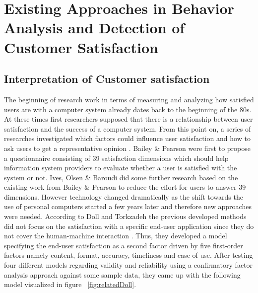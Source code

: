\chapter{Existing Approaches in Behavior Analysis and Detection of Customer Satisfaction}
\label{ch:backgroundResearch}

\section{Interpretation of Customer satisfaction}
The beginning of research work in terms of measuring and analyzing how satisfied users are with a computer system already dates back to the beginning of the 80s. At these times first researchers supposed that there is a relationship between user satisfaction and the success of a computer system. From this point on, a series of researches investigated which factors could influence user satisfaction and how to ask users to get a representative opinion \cite{roy1998developing}. Bailey \& Pearson were first to propose a questionnaire consisting of 39 satisfaction dimensions which should help information system providers to evaluate whether a user is satisfied with the system or not. Ives, Olsen \& Baroudi did some further research based on the existing work from Bailey \& Pearson to reduce the effort for users to answer 39 dimensions. However technology changed dramatically as the shift towards the use of personal computers started a few years later and therefore new approaches were needed. According to Doll and Torkzadeh the previous developed methods did not focus on the satisfaction with a specific end-user application since they do not cover the human-machine interaction \cite{roy1998developing}. Thus, they developed a model specifying the end-user satisfaction as a second factor driven by five first-order factors namely content, format, accuracy, timeliness and ease of use. After testing four different models regarding validity and reliability using a confirmatory factor analysis approach against some sample data, they came up with the following model visualized in figure ~\ref{fig:relatedDoll}. 

